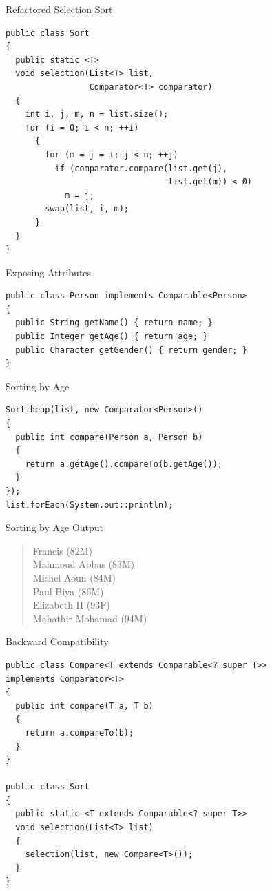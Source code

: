\documentclass[pdf]{beamer}
\begin{document}
\begin{frame}[fragile]{Refactored Selection Sort}
\begin{verbatim}
public class Sort
{
  public static <T>
  void selection(List<T> list,
                 Comparator<T> comparator)
  {
    int i, j, m, n = list.size();
    for (i = 0; i < n; ++i)
      {
        for (m = j = i; j < n; ++j)
          if (comparator.compare(list.get(j),
                                 list.get(m)) < 0)
            m = j;
        swap(list, i, m);
      }
  }
}
\end{verbatim}
\end{frame}

\begin{frame}[fragile]{Exposing Attributes}
\begin{verbatim}
public class Person implements Comparable<Person>
{
  public String getName() { return name; }
  public Integer getAge() { return age; }
  public Character getGender() { return gender; }
}
\end{verbatim}
\end{frame}

\begin{frame}[fragile]{Sorting by Age}
\begin{verbatim}
Sort.heap(list, new Comparator<Person>()
{
  public int compare(Person a, Person b)
  {
    return a.getAge().compareTo(b.getAge());
  }
});
list.forEach(System.out::println);
\end{verbatim}
\end{frame}

\begin{frame}{Sorting by Age Output}\Large
  \begin{quote}
    Francis (82M)\\
    Mahmoud Abbas (83M)\\
    Michel Aoun (84M)\\
    Paul Biya (86M)\\
    Elizabeth II (93F)\\
    Mahathir Mohamad (94M)
  \end{quote}
\end{frame}

\begin{frame}[fragile]{Backward Compatibility}
\begin{verbatim}
public class Compare<T extends Comparable<? super T>>
implements Comparator<T>
{
  public int compare(T a, T b)
  {
    return a.compareTo(b);
  }
}

public class Sort
{
  public static <T extends Comparable<? super T>>
  void selection(List<T> list)
  {
    selection(list, new Compare<T>());
  }
}
\end{verbatim}
\end{frame}
\end{document}
